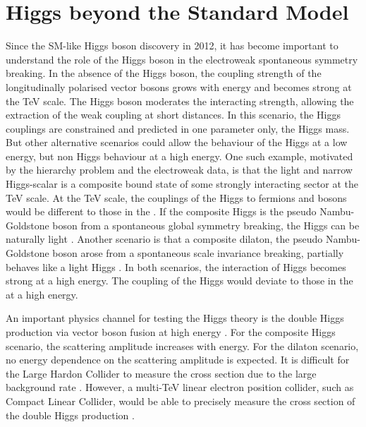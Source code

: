 \section{Higgs beyond the Standard Model}
\label{sec:theoryHiggsBSM}

Since the SM-like Higgs boson discovery in 2012, it has become important to understand the role of the Higgs boson in the electroweak spontaneous symmetry breaking. In the absence of the Higgs boson, the coupling strength of the longitudinally polarised vector bosons grows with energy and becomes strong at the TeV scale. The \SM Higgs boson moderates the interacting strength, allowing the extraction of the weak coupling at short distances. In this scenario, the \SM Higgs couplings are constrained and predicted in one parameter only, the Higgs mass. But other alternative scenarios could allow the behaviour of the \SM Higgs at a low energy, but non \SM Higgs behaviour at a high energy. One such example, motivated by the hierarchy problem and the electroweak data, is that the light and narrow Higgs-scalar is a composite bound state of some strongly interacting sector at the TeV scale.   At the TeV scale, the couplings of the Higgs to fermions and bosons would be different to those in the \SM. If the composite Higgs is the pseudo Nambu-Goldstone boson from a spontaneous global symmetry breaking, the Higgs can be naturally light \cite{Kaplan:1983fs}. Another scenario is that a composite dilaton, the pseudo Nambu-Goldstone boson arose from a spontaneous scale invariance breaking, partially behaves like a light Higgs \cite{Goldberger:2008zz}. In both scenarios, the interaction of Higgs becomes strong at a high energy. The coupling of the Higgs would deviate to those in the \SM at a high energy.

An important physics channel for testing the Higgs theory is the double Higgs production via vector boson fusion at high energy \cite{Giudice:2007fh,Contino:2010mh,Contino:2013gna}. For the composite Higgs scenario, the scattering amplitude increases with energy. For the dilaton scenario, no energy dependence on the scattering amplitude is expected. It is difficult for the Large Hardon Collider to measure the cross section due to the large \SM background rate \cite{Contino:2010mh}. However, a multi-TeV linear electron position collider, such as Compact Linear Collider, would be able to precisely measure the cross section of the double Higgs production \cite{Barger:2003rs}.

